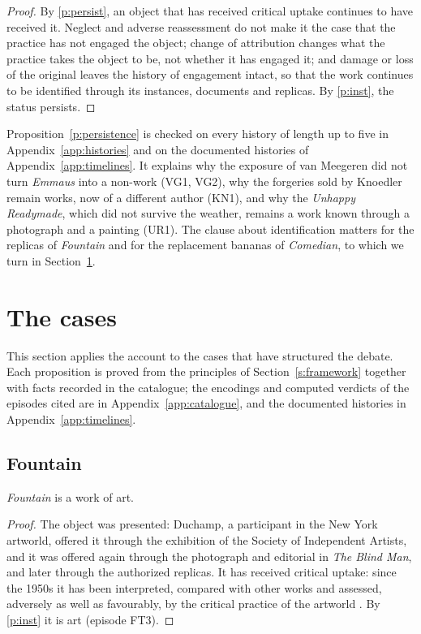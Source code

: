 \documentclass{situationist-preprint}
\begin{document}
\begin{proof}
By \ref{p:persist}, an object that has received critical uptake continues to have received it. Neglect and adverse reassessment do not make it the case that the practice has not engaged the object; change of attribution changes what the practice takes the object to be, not whether it has engaged it; and damage or loss of the original leaves the history of engagement intact, so that the work continues to be identified through its instances, documents and replicas. By \ref{p:inst}, the status persists.
\end{proof}

Proposition~\ref{p:persistence} is checked on every history of length up to five in Appendix~\ref{app:histories} and on the documented histories of Appendix~\ref{app:timelines}. It explains why the exposure of van Meegeren did not turn \emph{Emmaus} into a non-work (VG1, VG2), why the forgeries sold by Knoedler remain works, now of a different author (KN1), and why the \emph{Unhappy Readymade}, which did not survive the weather, remains a work known through a photograph and a painting (UR1). The clause about identification matters for the replicas of \emph{Fountain} and for the replacement bananas of \emph{Comedian}, to which we turn in Section~\ref{s:cases}.

\section{The cases}\label{s:cases}

This section applies the account to the cases that have structured the debate. Each proposition is proved from the principles of Section~\ref{s:framework} together with facts recorded in the catalogue; the encodings and computed verdicts of the episodes cited are in Appendix~\ref{app:catalogue}, and the documented histories in Appendix~\ref{app:timelines}.

\subsection{Fountain}

\begin{proposition}\label{p:fountain}
\emph{Fountain} is a work of art.
\end{proposition}

\begin{proof}
The object was presented: Duchamp, a participant in the New York artworld, offered it through the exhibition of the Society of Independent Artists, and it was offered again through the photograph and editorial in \emph{The Blind Man}, and later through the authorized replicas. It has received critical uptake: since the 1950s it has been interpreted, compared with other works and assessed, adversely as well as favourably, by the critical practice of the artworld \citep{deDuve1996}. By \ref{p:inst} it is art (episode FT3).
\end{proof}
\end{document}
